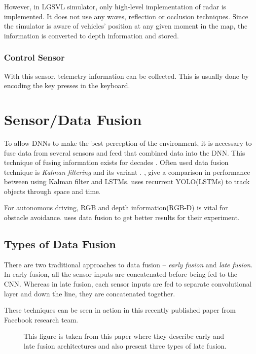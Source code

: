 However, in LGSVL simulator, only high-level implementation of radar is implemented. It
does not use any waves, reflection or occlusion techniques. Since the simulator is aware
of vehicles' position at any given moment in the map, the information is converted to
depth information and stored.

\subsubsection*{Control Sensor}
With this sensor, telemetry information can be collected. This is usually done by
encoding the key presses in the keyboard.

\section{Sensor/Data Fusion}
\label{sec:datafusion}
To allow DNNs to make the best perception of the environment, it is necessary to fuse data from
several sensors and feed that combined data into the DNN. This technique of fusing
information exists for decades \cite{Datafusion1}. Often used data fusion technique is
\textit{Kalman filtering} and its variant \cite{Datafusion3} \cite{Datafusion2}. \cite{kalmanfilterpaper1},
\cite{kalmanfilterpaper2} give a comparison in performance between using Kalman filter and
LSTMs. \cite{kalmanfilterpaper3} uses recurrent YOLO(LSTMs) to track objects through space and time.

For autonomous driving, RGB and depth information(RGB-D) is vital for obstacle avoidance.
\cite{XiaoCodevillaMultimodalE2E} uses data fusion to get better results for their
experiment.
\subsection{Types of Data Fusion}
There are two traditional approaches to data fusion -- \textit{early fusion} and
\textit{late fusion}.
In early fusion, all the sensor inputs are concatenated before being fed to the CNN.
Whereas in late fusion, each sensor inputs are fed to separate convolutional layer and
down the line, they are concatenated together.

These techniques can be seen in action in this \cite{wang2020makes} recently
published paper from Facebook research team.
\begin{figure}[h]
	\begin{center}
        \def\svgwidth{1.09\textwidth}
	\end{center}
    \caption{This figure is taken from this \cite{Datafusion4} paper where they describe early and
        late fusion architectures and also present three types of late fusion.}
    \label{fig:Datafusiontypes}
\end{figure}


